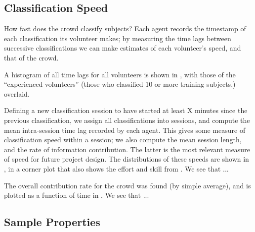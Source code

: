 \documentclass[useAMS,usenatbib,a4paper]{mn2e}
\begin{document}
\subsection{Classification Speed}
\label{sec:results:speed}

How fast does the \sw crowd classify subjects? Each agent records the
timestamp of each classification its volunteer makes; by measuring the time
lags between successive classifications we can make estimates of each
volunteer's speed, and that of the crowd.

A histogram of all time lags for all volunteers is shown in
, with those of the ``experienced volunteers''
(those who classified 10 or more training subjects.) overlaid. 


Defining a new classification session to have started at least X minutes since
the previous classification, we assign all classifications into sessions, and
compute the mean intra-session time lag recorded by each agent. This gives
some measure of classification speed within a session; we also compute the 
mean session length, and the rate of information contribution. The
latter is the most relevant measure of speed for future project design. The
distributions of these speeds are shown in , in a corner
plot that also shows the effort and skill from . We
see that ...

The overall contribution rate for the \sw crowd was found (by simple average),
and is plotted as a function of time in . We see that
...



\subsection{Sample Properties}
\label{sec:results:sample}
\end{document}
